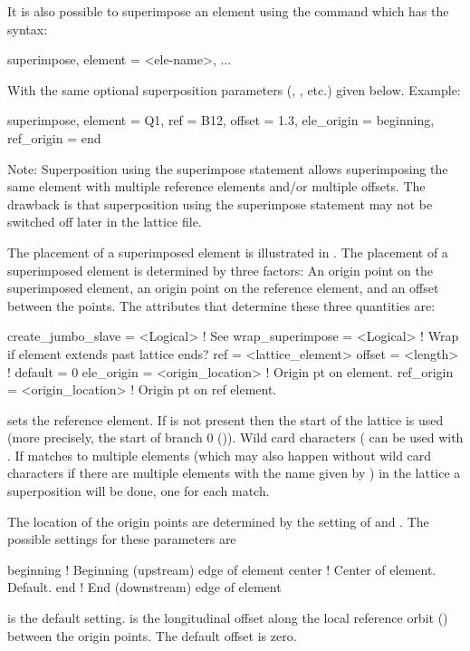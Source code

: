 It is also possible to superimpose an element using the  command which has the
syntax:
\begin{example}
  superimpose, element = <ele-name>, ...
\end{example}
With the same optional superposition parameters (, , etc.) given below.
Example:
\begin{example}
  superimpose, element = Q1, ref = B12, offset = 1.3, 
                               ele_origin = beginning, ref_origin = end
\end{example}
Note: Superposition using the superimpose statement allows superimposing the same element with
multiple reference elements and/or multiple offsets. The drawback is that superposition using the
superimpose statement may not be switched off later in the lattice file.

The placement of a superimposed element is illustrated in . The placement of a
superimposed element is determined by three factors: An origin point on the superimposed element, an
origin point on the reference element, and an offset between the points. The attributes that
determine these three quantities are:
\begin{example}
  create_jumbo_slave = <Logical>     ! See 
  wrap_superimpose   = <Logical>     ! Wrap if element extends past lattice ends?
  ref          = <lattice_element>
  offset       = <length>            ! default = 0
  ele_origin   = <origin_location>   ! Origin pt on element.
  ref_origin   = <origin_location>   ! Origin pt on ref element.
\end{example}
 sets the reference element. If  is not present then the start of the lattice is
used (more precisely, the start of branch 0 ()). Wild card characters
( can be used with . If  matches to multiple elements (which may
also happen without wild card characters if there are multiple elements with the name given by
) in the lattice a superposition will be done, one for each match.

The location of the origin points are determined by the setting of  and
.  The possible settings for these parameters are
\begin{example}
  beginning       ! Beginning (upstream) edge of element
  center          ! Center of element. Default.
  end             ! End (downstream) edge of element
\end{example}
 is the default setting.  is the longitudinal offset along the local reference
orbit () between the origin points. The default offset is zero.

